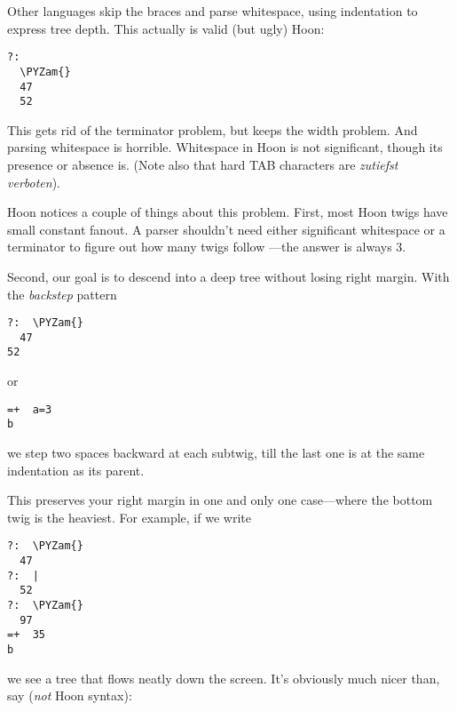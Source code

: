Other languages skip the braces and parse whitespace, using
indentation to express tree depth.  This actually is valid (but
ugly) Hoon:

\begin{framed_shaded}
\begin{Verbatim}[fontsize=\relsize{-2.5},fontseries=b,commandchars=\\\{\}]
?:
  \PYZam{}
  47
  52
\end{Verbatim}
\end{framed_shaded}
This gets rid of the terminator problem, but keeps the width
problem.  And parsing whitespace is horrible.  Whitespace in Hoon
is not significant, though its presence or absence is.  (Note
also that hard TAB characters are \emph{zutiefst verboten}).

Hoon notices a couple of things about this problem.  First, most
Hoon twigs have small constant fanout.  A parser shouldn't need
either significant whitespace or a terminator to figure out how
many twigs follow ---the answer is always 3.

Second, our goal is to descend into a deep tree without losing
right margin.  With the \emph{backstep} pattern

\begin{framed_shaded}
\begin{Verbatim}[fontsize=\relsize{-2.5},fontseries=b,commandchars=\\\{\}]
?:  \PYZam{}
  47
52
\end{Verbatim}
\end{framed_shaded}
or

\begin{framed_shaded}
\begin{Verbatim}[fontsize=\relsize{-2.5},fontseries=b,commandchars=\\\{\}]
=+  a=3
b
\end{Verbatim}
\end{framed_shaded}
we step two spaces backward at each subtwig, till the last one is
at the same indentation as its parent.

This preserves your right margin in one and only one case---where
the bottom twig is the heaviest.  For example, if we write

\begin{framed_shaded}
\begin{Verbatim}[fontsize=\relsize{-2.5},fontseries=b,commandchars=\\\{\}]
?:  \PYZam{}
  47
?:  |
  52
?:  \PYZam{}
  97
=+  35
b
\end{Verbatim}
\end{framed_shaded}
we see a tree that flows neatly down the screen.  It's obviously
much nicer than, say (\emph{not} Hoon syntax):

